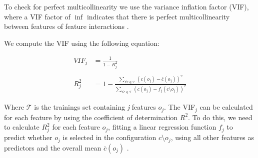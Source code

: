 To check for perfect multicollinearity we use the variance inflation factor (VIF), where a VIF factor of $\inf$ indicates
that there is perfect multicollinearity between features of feature interactions \cite{Multicollinearity}.

We compute the VIF using the following equation:

\begin{align}
    VIF_{j} &= \frac{1}{1 - R^{2}_{j}}  \\ \nonumber\\
    R^{2}_{j} &= 1 - \frac{\sum\limits_{\forall c \in \mathcal{T}} (c(o_j) - \overline{c}(o_j))^2} {\sum\limits_{\forall c \in \mathcal{T}}(c(o_j) - f_j(c \setminus o_j))^2}
\end{align}

Where $\mathcal{T}$ is the trainings set containing \textit{j} features $o_j$. The VIF$_{j}$ can be calculated for each feature by using the coefficient
of determination $R^2$. To do this, we need to calculate $R^{2}_j$ for each feature $o_j$, fitting a linear regression function $f_j$ to predict whether $o_j$
is selected in the configuration $c \setminus o_j$, using all other features as predictors and the overall mean $\overline{c}(o_j)$ \cite{Multicollinearity}.

